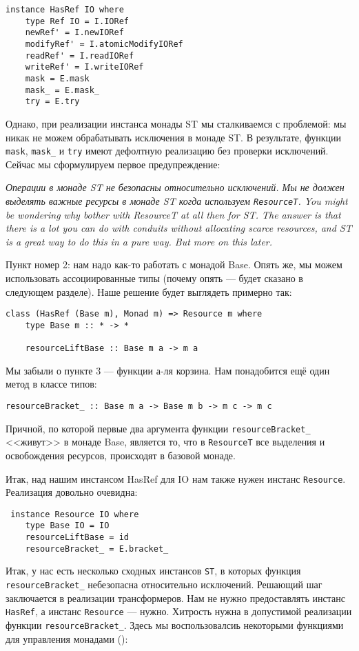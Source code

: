 \begin{lstlisting}
instance HasRef IO where
    type Ref IO = I.IORef
    newRef' = I.newIORef
    modifyRef' = I.atomicModifyIORef
    readRef' = I.readIORef
    writeRef' = I.writeIORef
    mask = E.mask
    mask_ = E.mask_
    try = E.try 
\end{lstlisting}
Однако, при реализации инстанса монады ST мы сталкиваемся с проблемой: мы никак не можем
обрабатывать исключения в монаде ST. В результате, функции \lstinline'mask',
\lstinline'mask_' и \lstinline'try' имеют
дефолтную реализацию без проверки исключений. Сейчас мы сформулируем первое
предупреждение:

\textit{Операции в монаде ST не безопасны относительно исключений. Мы не должен выделять
важные ресурсы в монаде ST когда используем \lstinline'ResourceT'. You might be wondering
why bother
with
ResourceT at all then for ST. The answer is that there is a
lot you can do with conduits without allocating scarce resources, and ST is a
great way to do this in a pure way. But more on this later. 
}


Пункт номер 2: нам надо как-то работать с монадой Base. Опять же, мы можем
использовать ассоциированные типы (почему опять --- будет сказано в следующем разделе). 
Наше решение будет выглядеть примерно так:
\begin{lstlisting}
class (HasRef (Base m), Monad m) => Resource m where
    type Base m :: * -> *

    resourceLiftBase :: Base m a -> m a 
\end{lstlisting}
Мы забыли о пункте 3 --- функции а-ля корзина. Нам понадобится ещё один метод в классе
типов:
\begin{lstlisting}
resourceBracket_ :: Base m a -> Base m b -> m c -> m c 
\end{lstlisting}
Причной, по которой первые два аргумента функции \lstinline'resourceBracket_' <<живут>> в
монаде Base, является то, что в \lstinline'ResourceT' все выделения и освобождения
ресурсов, происходят в базовой монаде.

Итак, над нашим инстансом HasRef для IO нам также нужен инстанс
\lstinline'Resource'. Реализация довольно очевидна:
\begin{lstlisting}
 instance Resource IO where
    type Base IO = IO
    resourceLiftBase = id
    resourceBracket_ = E.bracket_
\end{lstlisting}

Итак, у нас есть несколько сходных инстансов \lstinline'ST', в которых функция
\lstinline'resourceBracket_' небезопасна относительно исключений. Решающий шаг заключается
в реализации трансформеров. Нам не нужно
предоставлять инстанс \lstinline'HasRef', а инстанс \lstinline'Resource' --- нужно.
Хитрость нужна в допустимой реализации функции \lstinline'resourceBracket_'. Здесь мы
воспользовалсиь некоторыми функциями для управления монадами 
():

